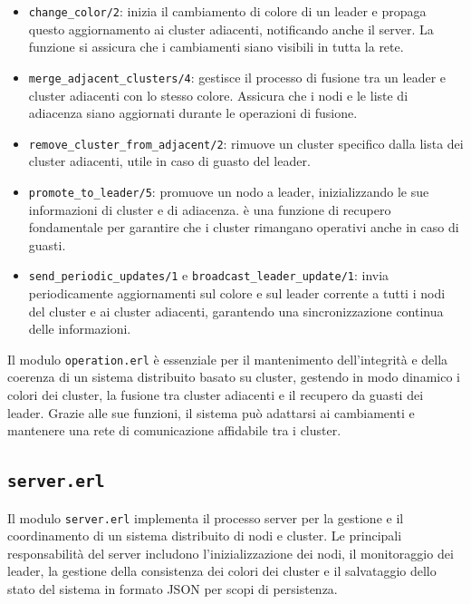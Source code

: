 \documentclass[12pt, a4paper]{report}
\begin{document}
\begin{itemize}
    \item \texttt{change\_color/2}: inizia il cambiamento di colore di un leader e propaga questo aggiornamento ai cluster adiacenti, notificando anche il server. La funzione si assicura che i cambiamenti siano visibili in tutta la rete.

    \item \texttt{merge\_adjacent\_clusters/4}: gestisce il processo di fusione tra un leader e cluster adiacenti con lo stesso colore. Assicura che i nodi e le liste di adiacenza siano aggiornati durante le operazioni di fusione.

    \item \texttt{remove\_cluster\_from\_adjacent/2}: rimuove un cluster specifico dalla lista dei cluster adiacenti, utile in caso di guasto del leader.

    \item \texttt{promote\_to\_leader/5}: promuove un nodo a leader, inizializzando le sue informazioni di cluster e di adiacenza. \`e una funzione di recupero fondamentale per garantire che i cluster rimangano operativi anche in caso di guasti.

    \item \texttt{send\_periodic\_updates/1} e \texttt{broadcast\_leader\_update/1}: invia periodicamente aggiornamenti sul colore e sul leader corrente a tutti i nodi del cluster e ai cluster adiacenti, garantendo una sincronizzazione continua delle informazioni.

\end{itemize}

\noindent
Il modulo \texttt{operation.erl} \`e essenziale per il mantenimento dell'integrità e della coerenza di un sistema distribuito basato su cluster, gestendo in modo dinamico i colori dei cluster, la fusione tra cluster adiacenti e il recupero da guasti dei leader. Grazie alle sue funzioni, il sistema può adattarsi ai cambiamenti e mantenere una rete di comunicazione affidabile tra i cluster.

\subsection{\texttt{server.erl}}

Il modulo \texttt{server.erl} implementa il processo server per la gestione e il coordinamento di un sistema distribuito di nodi e cluster. Le principali responsabilità del server includono l'inizializzazione dei nodi, il monitoraggio dei leader, la gestione della consistenza dei colori dei cluster e il salvataggio dello stato del sistema in formato JSON per scopi di persistenza.
\end{document}
